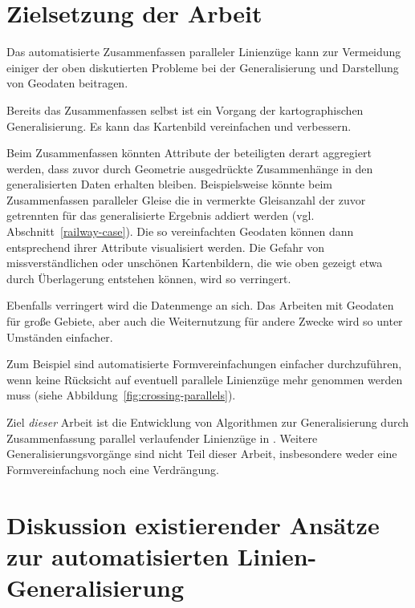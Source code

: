 \documentclass[../main/thesis.tex]{subfiles}
\begin{document}
\section{Zielsetzung der Arbeit}

Das automatisierte Zusammenfassen paralleler Linienzüge kann zur Vermeidung einiger der oben diskutierten Probleme bei der Generalisierung und Darstellung von Geodaten beitragen.

Bereits das Zusammenfassen selbst ist ein Vorgang der kartographischen Generalisierung.
Es kann das Kartenbild vereinfachen und verbessern.

Beim Zusammenfassen könnten Attribute der beteiligten  derart aggregiert werden, dass zuvor durch Geometrie ausgedrückte Zusammenhänge in den generalisierten Daten erhalten bleiben.
Beispielsweise könnte beim Zusammenfassen paralleler Gleise die in  vermerkte Gleisanzahl der zuvor getrennten  für das generalisierte Ergebnis addiert werden (vgl. Abschnitt~\ref{railway-case}).
Die so vereinfachten Geodaten können dann entsprechend ihrer Attribute visualisiert werden.
Die Gefahr von missverständlichen oder unschönen Kartenbildern, die wie oben gezeigt etwa durch Überlagerung entstehen können, wird so verringert.

Ebenfalls verringert wird die Datenmenge an sich.
Das Arbeiten mit Geodaten für große Gebiete, aber auch die Weiternutzung für andere Zwecke wird so unter Umständen einfacher.

Zum Beispiel sind automatisierte Formvereinfachungen einfacher durchzuführen, wenn keine Rücksicht auf eventuell parallele Linienzüge mehr genommen werden muss (siehe Abbildung~\ref{fig:crossing-parallels}).


Ziel \emph{dieser} Arbeit ist die Entwicklung von Algorithmen zur Generalisierung durch Zusammenfassung parallel verlaufender Linienzüge in \osm.
Weitere Generalisierungsvorgänge sind nicht Teil dieser Arbeit, insbesondere weder eine Formvereinfachung noch eine Verdrängung.



\section[Diskussion existierender Ansätze]{Diskussion existierender Ansätze zur automatisierten Linien-Generalisierung}
\label{ch:existing-approaches}
\end{document}
